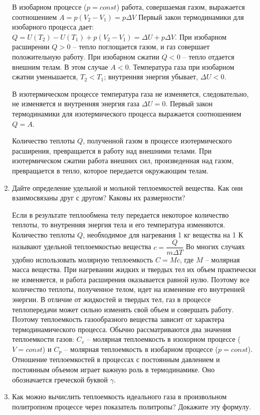 \documentclass[12pt,a4paper]{article}%
\begin{document}
\begin{enumerate}
	В изобарном процессе ($p=const$) работа, совершаемая газом, выражается соотношением $A = p(V_2-V_1) = p\Delta V$  Первый закон термодинамики для изобарного процесса дает: $Q = U(T_2) - U(T_1) + p(V_2-V_1) = \Delta U + p\Delta V$. При изобарном расширении $Q>0$ – тепло поглощается газом, и газ совершает положительную работу. При изобарном сжатии $Q<0$ – тепло отдается внешним телам. В этом случае $A<0$. Температура газа при изобарном сжатии уменьшается, $T_2 < T_1$; внутренняя энергия убывает, $\Delta U < 0$.
	
	В изотермическом процессе температура газа не изменяется, следовательно, не изменяется и внутренняя энергия газа $\Delta U = 0$. Первый закон термодинамики для изотермического процесса выражается соотношением $Q=A$.
	
	Количество теплоты $Q$, полученной газом в процессе изотермического расширения, превращается в работу над внешними телами. При изотермическом сжатии работа внешних сил, произведенная над газом, превращается в тепло, которое передается окружающим телам.
	
	\item Дайте определение удельной и мольной теплоемкостей вещества. Как они взаимосвязаны друг с другом? Каковы их размерности?
	
	Если в результате теплообмена телу передается некоторое количество теплоты, то внутренняя энергия тела и его температура изменяются. Количество теплоты $Q$, необходимое для нагревания 1 кг вещества на 1 К называют удельной теплоемкостью вещества $c = \dfrac{Q}{m\Delta T}$
	Во многих случаях удобно использовать молярную теплоемкость $C = M c$, где $M$ – молярная масса вещества. При нагревании жидких и твердых тел их объем практически не изменяется, и работа расширения оказывается равной нулю. Поэтому все количество теплоты, полученное телом, идет на изменение его внутренней энергии. В отличие от жидкостей и твердых тел, газ в процессе теплопередачи может сильно изменять свой объем и совершать работу. Поэтому теплоемкость газообразного вещества зависит от характера термодинамического процесса. Обычно рассматриваются два значения теплоемкости газов: $C_v$ – молярная теплоемкость в изохорном процессе ($V = const$) и $C_p$ – молярная теплоемкость в изобарном процессе ($p = const$). Отношение теплоемкостей в процессах с постоянным давлением и постоянным объемом играет важную роль в термодинамике. Оно обозначается греческой буквой $\gamma$.
	
	\item Как можно вычислить теплоемкость идеального газа в произвольном 
	политропном процессе через показатель политропы? Докажите эту формулу.
	

\end{enumerate}
\end{document}
